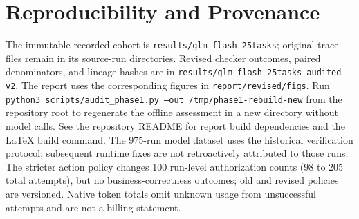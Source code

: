 \documentclass[10pt,twocolumn,letterpaper]{article}
\newcommand{\f}[1]{\texttt{\small #1}}
\begin{document}
\section{Reproducibility and Provenance}
{\raggedright
The immutable recorded cohort is \f{results/glm-flash-25tasks}; original
trace files remain in its source-run directories. Revised checker outcomes,
paired denominators, and lineage hashes are in
\f{results/glm-flash-25tasks-audited-v2}. The report uses the corresponding
figures in \f{report/revised/figs}. Run
\f{python3 scripts/audit\_phase1.py --out /tmp/phase1-rebuild-new}
from the repository root to regenerate the offline assessment in a new
directory without model calls. See the repository README for report build
dependencies and the LaTeX build command. The 975-run model dataset uses the
historical verification protocol; subsequent runtime fixes are not
retroactively attributed to those runs. The stricter action policy changes
100 run-level authorization counts (98 to 205 total attempts), but no
business-correctness outcomes; old and revised policies are versioned.
Native token totals omit unknown usage from unsuccessful attempts and are
not a billing statement.\par}
\end{document}
